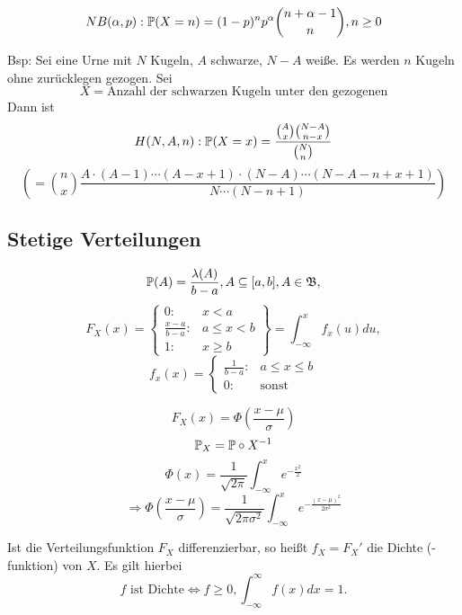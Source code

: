 				\begin{defi}
					\[ NB(\alpha,p): \P(X=n)=(1-p)^np^\alpha\binom{n+\alpha-1}{n}, n\ge 0 \]
					
				\end{defi}
				
				\begin{defi}
					Bsp: Sei eine Urne mit $N$ Kugeln, $A$ schwarze, $N-A$ weiße. Es werden $n$ Kugeln ohne zurücklegen gezogen. Sei 
					\[ X=\text{Anzahl der schwarzen Kugeln unter den gezogenen} \]
					Dann ist
					\[ H(N,A,n):\P(X=x)=\frac{\binom{A}{x}\binom{N-A}{n-x}}{\binom{N}{n}}\]
					\[\left(=\binom{n}{x}\frac{A\cdot(A-1)\cdots (A-x+1)\cdot(N-A)\cdots(N-A-n+x+1)}{N\cdots (N-n+1)}\right) \]
				\end{defi}
			
			\subsection{Stetige Verteilungen}
				\begin{defi}
					\[ \P(A)=\frac{\lambda(A)}{b-a}, A\subseteq[a,b], A\in\mf{B}, \]
					\[ F_X(x)=\left\{\begin{array}{ll}
					0: &x<a\\
					\frac{x-a}{b-a}: &a\le x<b\\
					1: &x\ge b
					\end{array}\right\}=\int_{-\infty}^{x}f_x(u) du, \]
					\[ f_x(x)=\begin{cases}
					\frac{1}{b-a}: &a\le x\le b\\0: &\text{sonst}
					\end{cases} \]
				\end{defi}
				
				\begin{defi}[Normalverteilung]
					\[ F_X(x)=\Phi\left(\frac{x-\mu}{\sigma}\right) \]
					\[ \P_X=\P\circ X^{-1} \]
					\[ \Phi(x)=\frac{1}{\sqrt{2\pi}}\int_{-\infty}^{x}e^{-\frac{x^2}{2}} \]
					\[ \Rightarrow \Phi\left(\frac{x-\mu}{\sigma}\right)=\frac{1}{\sqrt{2\pi\sigma^2}} \int_{-\infty}^{x}e^{-\frac{(x-\mu)^2}{2\sigma^2}}\]
				\end{defi}
				
				\begin{defi}
					Ist die Verteilungsfunktion $F_X$ differenzierbar, so heißt $f_X=F_X'$ die Dichte (-funktion) von $X$. Es gilt hierbei
					\[ f\text{ ist Dichte}\Leftrightarrow f\ge 0, \int_{-\infty}^{\infty}f(x)dx=1. \] 
				\end{defi}
				
